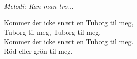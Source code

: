 {\footnotesize\textit{Melodi: Kan man tro...}}\par
\vspace{10pt}
Kommer der icke snært en Tuborg til meg,\\
Tuborg til meg, Tuborg til meg.\\
Kommer der icke snært en Tuborg til meg.\\
Röd eller grön til meg.
